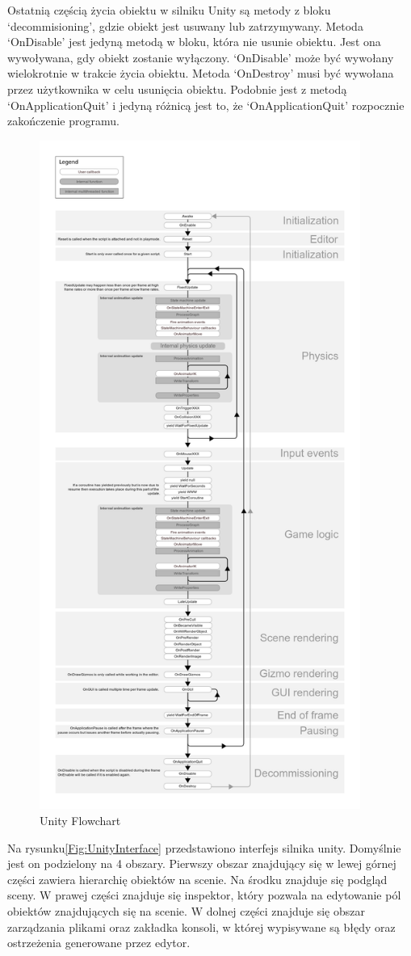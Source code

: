 \documentclass[12pt,twoside]{article}
\begin{document}
Ostatnią częścią życia obiektu w silniku Unity są metody z bloku
‘decommisioning’, gdzie obiekt jest usuwany lub zatrzymywany. Metoda ‘OnDisable’
jest jedyną metodą w bloku, która nie usunie obiektu. Jest ona wywoływana, gdy
obiekt zostanie wyłączony. ‘OnDisable’ może być wywołany wielokrotnie w trakcie
życia obiektu. Metoda ‘OnDestroy’ musi być wywołana przez użytkownika w celu
usunięcia obiektu. Podobnie jest z metodą ‘OnApplicationQuit’ i jedyną różnicą
jest to, że ‘OnApplicationQuit’ rozpocznie zakończenie programu. 




\begin{figure}[ht]
    \centering
    \includegraphics[width=10.5cm]{figures/UnityFlowchart.png}
    \caption{Unity Flowchart\cite{Unity:Flowchart}}
    \label{Unity:FlowchartFIG}
\end{figure}
\clearpage
Na rysunku\ref{Fig:UnityInterface} przedstawiono interfejs silnika unity.
Domyślnie jest on podzielony na 4 obszary. Pierwszy obszar znajdujący się w
lewej górnej części zawiera hierarchię obiektów na scenie. Na środku znajduje
się podgląd sceny. W prawej części znajduje się inspektor, który pozwala na
edytowanie pól obiektów znajdujących się na scenie. W dolnej części znajduje się
obszar zarządzania plikami oraz zakładka konsoli, w której wypisywane są błędy
oraz ostrzeżenia generowane przez edytor.
\end{document}
